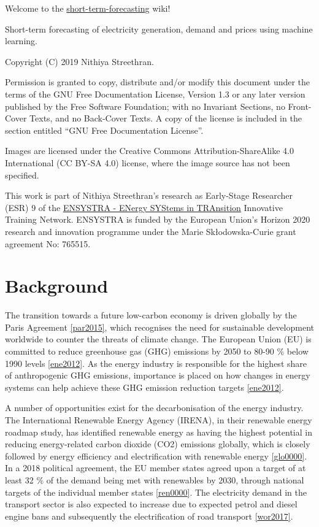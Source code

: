 Welcome to the
\href{https://github.com/ENSYSTRA/short-term-forecasting}{short-term-forecasting}
wiki!

Short-term forecasting of electricity generation, demand and prices
using machine learning.

Copyright (C) 2019 Nithiya Streethran.

Permission is granted to copy, distribute and/or modify this document
under the terms of the GNU Free Documentation License, Version 1.3 or
any later version published by the Free Software Foundation; with no
Invariant Sections, no Front-Cover Texts, and no Back-Cover Texts. A
copy of the license is included in the section entitled ``GNU Free
Documentation License''.

Images are licensed under the Creative Commons Attribution-ShareAlike
4.0 International (CC BY-SA 4.0) license, where the image source has not
been specified.

This work is part of Nithiya Streethran's research as Early-Stage
Researcher (ESR) 9 of the \href{https://ensystra.eu/}{ENSYSTRA - ENergy
SYStems in TRAnsition} Innovative Training Network. ENSYSTRA is funded
by the European Union's Horizon 2020 research and innovation programme
under the Marie Skłodowska-Curie grant agreement No: 765515.

\hypertarget{background}{%
\section{Background}\label{background}}

The transition towards a future low-carbon economy is driven globally by
the Paris Agreement \protect\hyperlink{par2015}{{[}par2015{]}}, which
recognises the need for sustainable development worldwide to counter the
threats of climate change. The European Union (EU) is committed to
reduce greenhouse gas (GHG) emissions by 2050 to 80-90 \% below 1990
levels \protect\hyperlink{ene2012}{{[}ene2012{]}}. As the energy
industry is responsible for the highest share of anthropogenic GHG
emissions, importance is placed on how changes in energy systems can
help achieve these GHG emission reduction targets
\protect\hyperlink{ene2012}{{[}ene2012{]}}.

A number of opportunities exist for the decarbonisation of the energy
industry. The International Renewable Energy Agency (IRENA), in their
renewable energy roadmap study, has identified renewable energy as
having the highest potential in reducing energy-related carbon dioxide
(CO2) emissions globally, which is closely followed by energy efficiency
and electrification with renewable energy
\protect\hyperlink{glo0000}{{[}glo0000{]}}. In a 2018 political
agreement, the EU member states agreed upon a target of at least 32 \%
of the demand being met with renewables by 2030, through national
targets of the individual member states
\protect\hyperlink{ren0000}{{[}ren0000{]}}. The electricity demand in
the transport sector is also expected to increase due to expected petrol
and diesel engine bans and subsequently the electrification of road
transport \protect\hyperlink{wor2017}{{[}wor2017{]}}.

